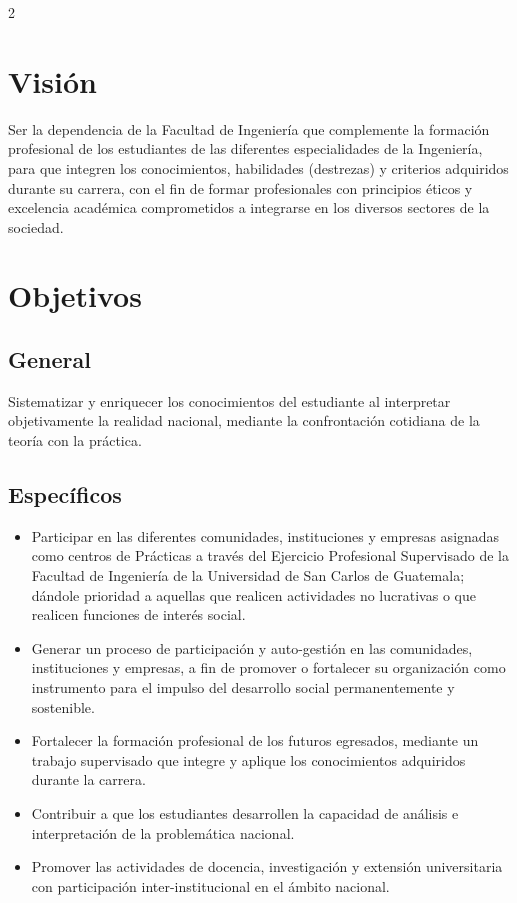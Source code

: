 \documentclass[11pt,spanish,Letterpaper,openany]{book}
\begin{document}
\begin {multicols}{2}
\hypertarget{vision}{%
\section*{Visión}\label{vision}}

Ser la dependencia de la Facultad de Ingeniería que complemente la formación profesional de los estudiantes de las diferentes especialidades de la Ingeniería, para que integren los conocimientos, habilidades (destrezas) y criterios adquiridos durante su carrera, con el fin de formar profesionales con principios éticos y excelencia académica comprometidos a integrarse en los diversos sectores de la sociedad.

\hypertarget{objetivos}{%
\section*{Objetivos}\label{objetivos}}

\hypertarget{general}{%
\subsection*{General}\label{general}}

Sistematizar y enriquecer los conocimientos del estudiante al interpretar objetivamente la realidad nacional, mediante la confrontación cotidiana de la teoría con la práctica.

\hypertarget{especificos}{%
\subsection*{Específicos}\label{especificos}}

\begin{itemize}
\item
  Participar en las diferentes comunidades, instituciones y empresas asignadas como centros de Prácticas a través del Ejercicio Profesional Supervisado de la Facultad de Ingeniería de la Universidad de San Carlos de Guatemala; dándole prioridad a aquellas que realicen actividades no lucrativas o que realicen funciones de interés social.
\item
  Generar un proceso de participación y auto-gestión en las comunidades, instituciones y empresas, a fin de promover o fortalecer su organización como instrumento para el impulso del desarrollo social permanentemente y sostenible.
\item
  Fortalecer la formación profesional de los futuros egresados, mediante un trabajo supervisado que integre y aplique los conocimientos adquiridos durante la carrera.
\item
  Contribuir a que los estudiantes desarrollen la capacidad de análisis e interpretación de la problemática nacional.
\item
  Promover las actividades de docencia, investigación y extensión universitaria con participación inter-institucional en el ámbito nacional.
\end{itemize}


\end{multicols}
\end{document}

